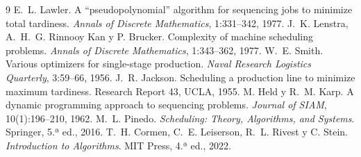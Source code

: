 \documentclass[10pt,twocolumn,letterpaper]{article}
\begin{document}
\begin{thebibliography}{9}
\small
{} E.~L. Lawler. A ``pseudopolynomial'' algorithm for sequencing
jobs to minimize total tardiness. \emph{Annals of Discrete Mathematics}, 1:331--342, 1977.
 J.~K. Lenstra, A.~H.~G. Rinnooy Kan y P. Brucker. Complexity of
machine scheduling problems. \emph{Annals of Discrete Mathematics}, 1:343--362, 1977.
 W.~E. Smith. Various optimizers for single-stage production.
\emph{Naval Research Logistics Quarterly}, 3:59--66, 1956.
 J.~R. Jackson. Scheduling a production line to minimize maximum
tardiness. Research Report 43, UCLA, 1955.
 M. Held y R.~M. Karp. A dynamic programming approach to
sequencing problems. \emph{Journal of SIAM}, 10(1):196--210, 1962.
 M.~L. Pinedo. \emph{Scheduling: Theory, Algorithms, and Systems}.
Springer, 5.ª ed., 2016.
 T.~H. Cormen, C.~E. Leiserson, R.~L. Rivest y C. Stein.
\emph{Introduction to Algorithms}. MIT Press, 4.ª ed., 2022.
\end{thebibliography}
\end{document}

